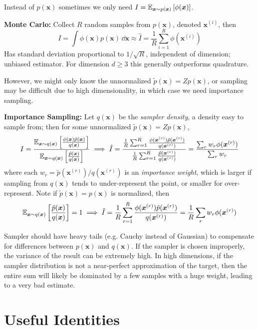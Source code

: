\documentclass[twocolumn, 8pt]{extarticle}
\begin{document}
Instead of \(p(\bm x)\) sometimes we only need \(I = \mathbb E_{\bm x \sim p(\bm x)}\left[\phi(\bm x)\right]\).

\textbf{Monte Carlo:} Collect \(R\) random samples from \(p(\bm x)\), denoted \(\bm x^{(i)}\), then
\[
    I = \int \phi(\bm x)p(\bm x)\,\dd\bm x \approx \hat I = \frac{1}{R}\sum _{i = 1}^R \phi(\bm x^{(i)})
\] 
Has standard deviation proportional to \(1/\sqrt{R}\), independent of dimension; unbiased estimator.
For dimension \(d \geq 3\) this generally outperforms quadrature.

However, we might only know the unnormalized \(\tilde p(\bm x) = Zp(\bm x)\), or sampling may be difficult due to high
dimensionality, in which case we need importance sampling.

\textbf{Importance Sampling:} Let \(q(\bm x)\) be the \textit{sampler density}, a density easy to sample from; then
for some unnormalized \(\tilde p(\bm x) = Zp(\bm x)\),
\[
    I = \frac{\mathbb E_{\bm x \sim q(\bm x)}\left[\frac{\phi(\bm x)\tilde p(\bm x)}{q(\bm x)}\right]}{\mathbb E_{\bm x \sim q(\bm x)}\left[\frac{\tilde p(\bm x)}{q(\bm x)}\right]}
    \implies \hat I = \frac{\frac{1}{R}\sum _{r = 1}^R \frac{\phi(\bm x^{(r)})\tilde p(\bm x^{(r)})}{q(\bm x^{(r)})}}{\frac{1}{R}\sum _{r = 1}^R \frac{\tilde p(\bm x^{(r)})}{q(\bm x^{(r)})}} = \frac{\sum _r w_r\phi(\bm x^{(r)})}{\sum _r w_r}
\]
where each \(w_r = \tilde p(\bm x^{(r)}) / q(\bm x^{(r)})\) is an \textit{importance weight}, which is larger if
sampling from \(q(\bm x)\) tends to under-represent the point, or smaller for over-represent.
Note if \(\tilde p(\bm x) = p(\bm x)\) is normalized, then
\[
    \mathbb E_{\bm x \sim q(\bm x)}\left[\frac{\tilde p(\bm x)}{q(\bm x)}\right] = 1
    \implies \hat I = \frac{1}{R}\sum _{r = 1}^R \frac{\phi(\bm x^{(r)})\tilde p(\bm x^{(r)})}{q(\bm x^{(r)})}
    = \frac{1}{R}\sum _r w_r\phi(\bm x^{(r)})
\]

Sampler should have heavy tails (e.g. Cauchy instead of Gaussian) to compensate for differences between \(p(\bm x)\) and
\(q(\bm x)\). If the sampler is chosen improperly, the variance of the result can be extremely high. In high dimensions,
if the sampler distribution is not a near-perfect approximation of the target, then the entire sum will likely be
dominated by a few samples with a huge weight, leading to a very bad estimate.

\hrulefill
\section{Useful Identities} %
\end{document}

